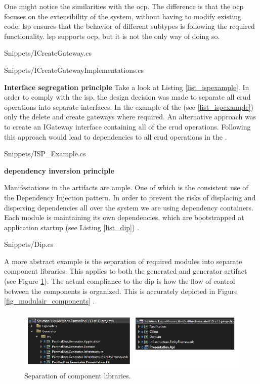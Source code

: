 One might notice the similarities with the \gls{ocp}. The difference is that the \gls{ocp}
focuses on the extensibility of the system, without having to modify existing code.
\gls{lsp} ensures that the behavior of different subtypes is following the required
functionality. \gls{lsp} supports \gls{ocp}, but it is not the only way of doing so.


    {Snippets/ICreateGateway.cs}


    {Snippets/ICreateGatewayImplementations.cs}

\textbf{Interface segregation principle}
Take a look at Listing \ref{list_ispexample}. In order to comply with the \gls{isp}, the
design decision was made to separate all \gls{crud} operations into separate interfaces.
In the example of the  (see \ref{list_ispexample})
only the delete and create gateways where required. An alternative approach was to create
an IGateway interface containing all of the \gls{crud} operations. Following this approach
would lead to dependencies to all \gls{crud} operations in the
.


    {Snippets/ISP_Example.cs}

    \textbf{dependency inversion principle}
    
Manifestations in the artifacts are ample. One of which is the consistent use of the
Dependency Injection pattern. In order to prevent the risks of displacing and dispersing
dependencies all over the system \parencite[214]{mannaert_normalized_2016} we are using
dependency containers. Each module is maintaining its own dependencies, which are
bootstrapped at application startup (see Listing \ref{list_dip})
\parencite{koks_generator_2023}.


    {Snippets/Dip.cs}

A more abstract example is the separation of required modules into separate component
libraries. This applies to both the generated and generator artifact (see Figure
\ref{fig_solutions}). The actual compliance to the \gls{dip} is how the flow of control
between the components is organized. This is accurately depicted in Figure
\ref{fig_modulair_components} .

\begin{figure}[H]
    \centering
    \includegraphics[width=1\textwidth]{figures/solutions.pdf}
    \caption[Separation of component libraries]{Separation of component libraries.}
    \label{fig_solutions}
\end{figure}